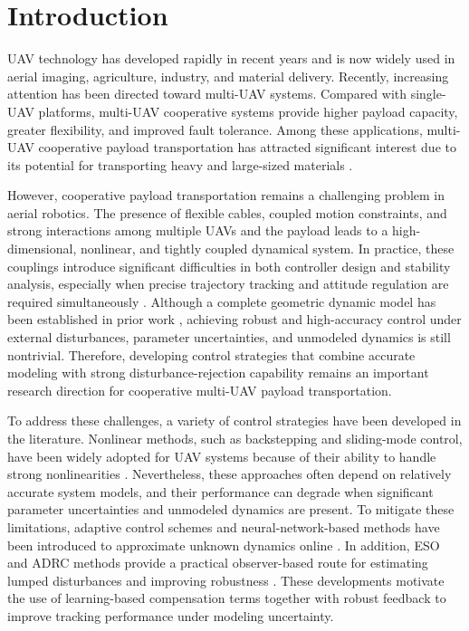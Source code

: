 \documentclass[Review,sageh,times]{sagej}
\begin{document}
\section*{Introduction}

UAV technology has developed rapidly in recent years and is now
widely used in aerial imaging, agriculture, industry, and material delivery.
Recently, increasing attention has been directed toward multi-UAV
systems. Compared with single-UAV platforms, multi-UAV cooperative
systems provide higher payload capacity, greater flexibility, and improved
fault tolerance. Among these applications, multi-UAV cooperative
payload transportation has attracted significant interest due to its potential
for transporting heavy and large-sized materials
\citep{fink2011,lee2013c,estevez2024}.

However, cooperative payload transportation remains a challenging
problem in aerial robotics. The presence of flexible cables, coupled motion
constraints, and strong interactions among multiple UAVs and the payload
leads to a high-dimensional, nonlinear, and tightly coupled dynamical
system. In practice, these couplings introduce significant difficulties in
both controller design and stability analysis, especially when precise
trajectory tracking and attitude regulation are required simultaneously
\citep{goodarzi2015,sreenath2013,lee2018}. Although a
complete geometric dynamic model has been established in prior work
\citep{lee2013a,lee2014}, achieving robust and high-accuracy control
under external disturbances, parameter uncertainties, and unmodeled
dynamics is still nontrivial. Therefore, developing control strategies that
combine accurate modeling with strong disturbance-rejection capability
remains an important research direction for cooperative multi-UAV
payload transportation.

To address these challenges, a variety of control strategies have been
developed in the literature. Nonlinear methods, such as backstepping
and sliding-mode control, have been widely adopted for UAV systems
because of their ability to handle strong nonlinearities
\citep{bouabdallah2005,madani2008,thanh2022}.
Nevertheless, these approaches often depend on relatively accurate system
models, and their performance can degrade when significant parameter
uncertainties and unmodeled dynamics are present. To mitigate these
limitations, adaptive control schemes and neural-network-based methods
have been introduced to approximate unknown dynamics online
\citep{sanner1992,park1991,shen2021}. In
addition, ESO and ADRC methods provide a practical observer-based
route for estimating lumped disturbances and improving robustness
\citep{han2009,gao2003,madonski2015,wang2022}.
These developments motivate the use of learning-based compensation
terms together with robust feedback to improve tracking performance
under modeling uncertainty.
\end{document}
